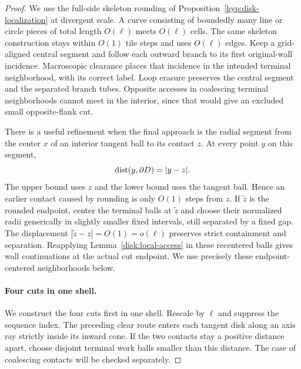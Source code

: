 \begin{proof}
We use the full-side skeleton rounding of
Proposition~\ref{hyp:disk-localization} at divergent scale.  A curve consisting
of boundedly many line or circle pieces of total length $O(\ell)$
meets $O(\ell)$ cells.  The same skeleton construction stays within
$O(1)$ tile steps and uses $O(\ell)$ edges.  Keep a grid-aligned central
segment and follow each outward branch to its first original-wall
incidence.  Macroscopic clearance places that incidence in the intended
terminal neighborhood, with its correct label.  Loop erasure preserves
the central segment and the separated branch tubes.  Opposite accesses
in coalescing terminal neighborhoods cannot meet in the interior,
since that would give an excluded small opposite-flank cut.

There is a useful refinement when the final approach is the radial
segment from the center $x$ of an interior tangent ball to its contact
$z$.  At every point $y$ on this segment,
\begin{equation}\label{disk:radial-clearance}
 \operatorname{dist}(y,\partial D)=|y-z|.
\end{equation}
The upper bound uses $z$ and the lower bound uses the tangent ball.
Hence an earlier contact caused by rounding is only $O(1)$ steps from
$z$.  If $\widetilde z$ is the rounded endpoint, center the terminal
balls at $\widetilde z$ and choose their normalized radii generically
in slightly smaller fixed intervals, still separated by a fixed gap.
The displacement $|\widetilde z-z|=O(1)=o(\ell)$ preserves strict
containment and separation.  Reapplying
Lemma~\ref{disk:local-access} in these recentered balls gives wall
continuations at the actual cut endpoint.  We use precisely these
endpoint-centered neighborhoods below.

\paragraph{Four cuts in one shell.}
We construct the four cuts first in one shell.  Rescale by
$\ell$ and suppress the sequence index.  The preceding clear route
enters each tangent disk along an axis ray strictly inside its inward
cone.  If the two contacts stay a positive distance apart, choose
disjoint terminal work balls smaller than this distance.  The case of
coalescing contacts will be checked separately.


\end{proof}
